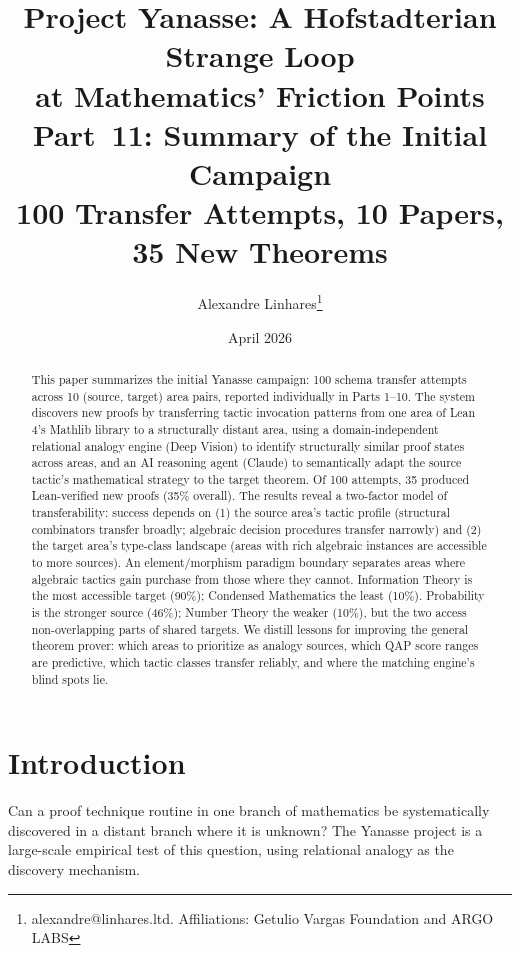 \documentclass[11pt]{article}
\title{Project Yanasse: A Hofstadterian Strange Loop\\at Mathematics' Friction Points\\[0.5em]
\large Part~11: Summary of the Initial Campaign\\[0.3em]
\normalsize 100 Transfer Attempts, 10 Papers, 35 New Theorems}
\author{Alexandre Linhares\thanks{alexandre@linhares.ltd. Affiliations: Getulio Vargas Foundation and ARGO LABS}}
\date{April 2026}
\theoremstyle{definition}
\theoremstyle{remark}
\begin{document}
\maketitle

\begin{abstract}
This paper summarizes the initial Yanasse campaign: 100 schema
transfer attempts across 10 (source, target) area pairs, reported
individually in Parts 1--10.  The system discovers new proofs by
transferring tactic invocation patterns from one area of Lean 4's
Mathlib library to a structurally distant area, using a
domain-independent relational analogy engine (Deep Vision) to
identify structurally similar proof states across areas, and an AI
reasoning agent (Claude) to semantically adapt the source tactic's
mathematical strategy to the target theorem.
%
Of 100 attempts, 35 produced Lean-verified new proofs (35\%
overall).  The results reveal a two-factor model of
transferability: success depends on (1) the source area's tactic
profile (structural combinators transfer broadly; algebraic decision
procedures transfer narrowly) and (2) the target area's type-class
landscape (areas with rich algebraic instances are accessible to
more sources).  An element/morphism paradigm boundary separates
areas where algebraic tactics gain purchase from those where they
cannot.  Information Theory is the most accessible target (90\%);
Condensed Mathematics the least (10\%).  Probability is the
stronger source (46\%); Number Theory the weaker (10\%), but the
two access non-overlapping parts of shared targets.
%
We distill lessons for improving the general theorem prover: which
areas to prioritize as analogy sources, which QAP score ranges are
predictive, which tactic classes transfer reliably, and where the
matching engine's blind spots lie.
\end{abstract}

\newpage
\tableofcontents
\newpage

\section{Introduction}\label{sec:intro}

Can a proof technique routine in one branch of mathematics be
systematically discovered in a distant branch where it is unknown?
The Yanasse project is a large-scale empirical test of this
question, using relational analogy as the discovery mechanism.
\end{document}

